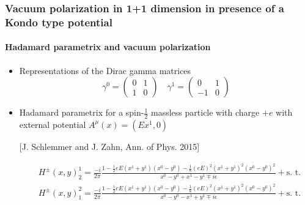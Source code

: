 \documentclass[french]{beamer}
\begin{document}
\begin{frame}[shrink=20]
\frametitle{Vacuum polarization in 1+1 dimension in presence of a Kondo type potential}
\framesubtitle{Hadamard parametrix and vacuum polarization}

\begin{itemize}
\item Representations of the Dirac gamma matrices
\begin{equation*}
\gamma^0 = \begin{pmatrix}
0 & 1 \\
1 & 0 \end{pmatrix}  \quad  \gamma^1 = \begin{pmatrix}
0  & 1 \\
-1 & 0
\end{pmatrix}
\end{equation*}

\item Hadamard parametrix for a spin-$\frac 1 2$ massless particle with charge $+e$ with external potential $A^\mu(x) = (Ex^1, 0 )$

\tiny\color{blue}[J. Schlemmer and J. Zahn, Ann. of Phys. 2015]\color{black}\normalsize

\begin{equation*}
\begin{split}
& H^\pm (x, y)^1_2 = \frac{-i}{2\pi}\frac{1-\frac i 2 e E(x^1 + y^1)(x^0-y^0) 
- \frac 1 8 (eE)^2(x^1 + y^1)^2(x^0 - y^0)^2}{x^0 - y^0 + x^1 - y^1 \mp i \epsilon}  + \textrm{s. t.}\\
& H^\pm (x, y)^2_1 = \frac{-i}{2\pi}\frac{1-\frac i 2 e E(x^1 + y^1)(x^0-y^0) 
- \frac 1 8 (eE)^2(x^1 + y^1)^2(x^0 - y^0)^2}{x^0 - y^0 - x^1 + y^1 \mp i \epsilon}+ \textrm{s. t.}
\end{split}
\end{equation*}

\end{itemize}

\end{frame}
\end{document}
